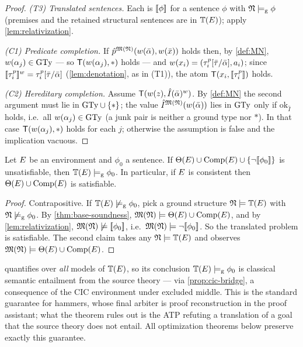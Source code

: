 \begin{proof}
  \emph{(T3) Translated sentences.}  Each is $[\![ \phi ]\!]$ for a sentence
  $\phi$ with $\mathfrak{N} \models_{\mathrm{g}} \phi$ (premises and the retained structural
  sentences are in $\mathbb{T}(E)$); apply \cref{lem:relativization}.

  \emph{(C1) Predicate completion.}  If
  $\hat p^{\mathfrak{M}(\mathfrak{N})}(w(\bar{\alpha}), w(\bar{x}))$ holds then, by
  \cref{def:MN}, $w(\alpha_j) \in \mathrm{GTy}$ --- so
  $\mathsf{T}(w(\alpha_j), \ast)$ holds --- and
  $w(x_i) = (\tau^p_i[\bar{\tau}/\bar{\alpha}], a_i)$; since
  $[\![ \tau^p_i ]\!]^{w} = \tau^p_i[\bar{\tau}/\bar{\alpha}]$
  (\cref{lem:denotation}, as in (T1)), the atom
  $\mathsf{T}(x_i, [\![ \tau^p_i ]\!])$ holds.

  \emph{(C2) Hereditary completion.}  Assume
  $\mathsf{T}(w(z), \hat I(\bar{\alpha})^{w})$.  By \cref{def:MN} the second
  argument must lie in $\mathrm{GTy} \cup \{\ast\}$; the value
  $\hat I^{\mathfrak{M}(\mathfrak{N})}(w(\bar{\alpha}))$ lies in $\mathrm{GTy}$ only if
  $\mathrm{ok}_{\hat I}$ holds, i.e.\ all $w(\alpha_j) \in \mathrm{GTy}$ (a junk
  pair is neither a ground type nor $\ast$).  In that case
  $\mathsf{T}(w(\alpha_j), \ast)$ holds for each $j$; otherwise the assumption is
  false and the implication vacuous.
\end{proof}

\begin{theorem}
  \label{thm:base-soundness-end}
  Let $E$ be an environment and $\phi_0$ a sentence.  If
  $\Theta(E) \cup \mathrm{Comp}(E) \cup \{\neg[\![ \phi_0 ]\!]\}$ is unsatisfiable, then
  $\mathbb{T}(E) \models_{\mathrm{g}} \phi_0$.  In particular, if $E$ is consistent then
  $\Theta(E) \cup \mathrm{Comp}(E)$ is satisfiable.
\end{theorem}

\begin{proof}
  Contrapositive.  If $\mathbb{T}(E) \not\models_{\mathrm{g}} \phi_0$, pick a ground structure
  $\mathfrak{N} \models \mathbb{T}(E)$ with $\mathfrak{N} \not\models_{\mathrm{g}} \phi_0$.  By
  \cref{thm:base-soundness}, $\mathfrak{M}(\mathfrak{N}) \models \Theta(E) \cup \mathrm{Comp}(E)$, and by
  \cref{lem:relativization}, $\mathfrak{M}(\mathfrak{N}) \not\models [\![ \phi_0 ]\!]$, i.e.\
  $\mathfrak{M}(\mathfrak{N}) \models \neg[\![ \phi_0 ]\!]$.  So the translated problem is
  satisfiable.  The second claim takes any $\mathfrak{N} \models \mathbb{T}(E)$ and observes
  $\mathfrak{M}(\mathfrak{N}) \models \Theta(E) \cup \mathrm{Comp}(E)$.
\end{proof}

\begin{remark}
   quantifies over \emph{all} models of
  $\mathbb{T}(E)$, so its conclusion $\mathbb{T}(E) \models_{\mathrm{g}} \phi_0$ is classical semantic
  entailment from the source theory --- via \cref{prop:cic-bridge}, a
  consequence of the CIC environment under excluded middle.  This is the
  standard guarantee for hammers, whose final arbiter is proof
  reconstruction in the proof assistant; what the theorem rules out is the
  ATP refuting a translation of a goal that the source theory does not
  entail.  All optimization theorems below preserve exactly this
  guarantee.
\end{remark}

